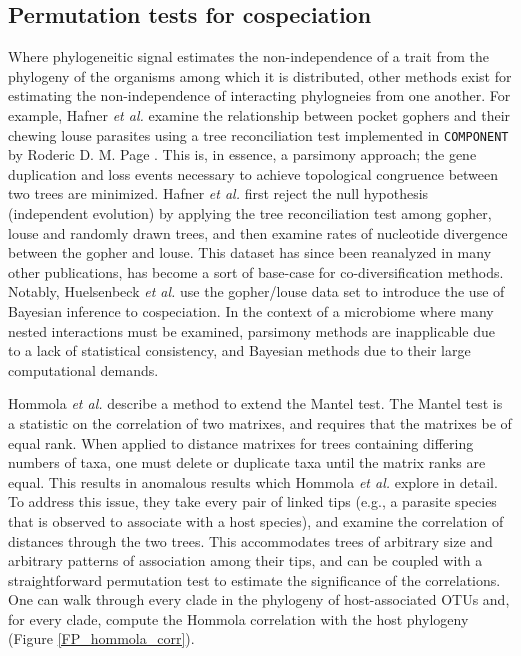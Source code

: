 \subsection{Permutation tests for cospeciation}\label{FP_permutation}

Where phylogeneitic signal estimates the non-independence of a trait from the phylogeny of the organisms among which it is distributed, other methods exist for estimating the non-independence of interacting phylogneies from one another. For example, Hafner {\em et al.} \cite{hafner1994disparate} examine the relationship between pocket gophers and their chewing louse parasites using a tree reconciliation test implemented in {\tt COMPONENT} by Roderic D. M. Page \cite{page1993genes}. This is, in essence, a parsimony approach; the gene duplication and loss events necessary to achieve topological congruence between two trees are minimized. Hafner {\em et al.} first reject the null hypothesis (independent evolution) by applying the tree reconciliation test among gopher, louse and randomly drawn trees, and then examine rates of nucleotide divergence between the gopher and louse. This dataset has since been reanalyzed in many other publications, has become a sort of base-case for co-diversification methods. Notably, Huelsenbeck {\em et al.} use the gopher/louse data set to introduce the use of Bayesian inference to cospeciation. \cite{huelsenbeck2000bayesian} In the context of a microbiome where many nested interactions must be examined, parsimony methods are inapplicable due to a lack of statistical consistency, \cite{felsenstein1978cases} and Bayesian methods due to their large computational demands.

Hommola {\em et al.} \cite{hommola2009permutation} describe a method to extend the Mantel test. \cite{mantel1967detection} The Mantel test is a statistic on the correlation of two matrixes, and requires that the matrixes be of equal rank. When applied to distance matrixes for trees containing differing numbers of taxa, one must delete or duplicate taxa until the matrix ranks are equal. This results in anomalous results which Hommola {\em et al.} explore in detail. To address this issue, they take every pair of linked tips (e.g., a parasite species that is observed to associate with a host species), and examine the correlation of distances through the two trees. This accommodates trees of arbitrary size and arbitrary patterns of association among their tips, and can be coupled with a straightforward permutation test to estimate the significance of the correlations. One can walk through every clade in the phylogeny of host-associated OTUs and, for every clade, compute the Hommola correlation with the host phylogeny (Figure \ref{FP_hommola_corr}). 

